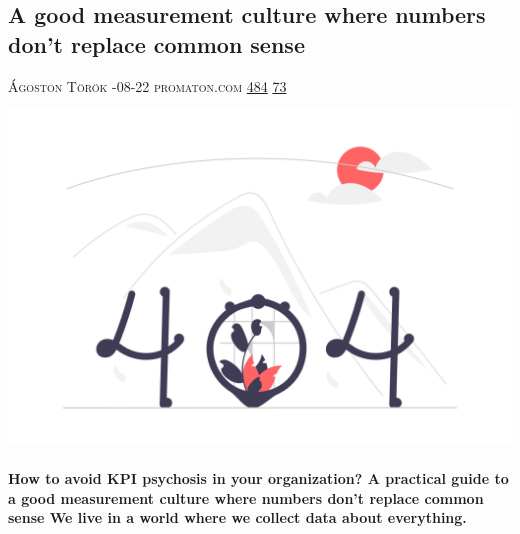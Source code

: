 \documentclass[10pt,a4paper]{article}
\begin{document}
\begin{multicols*}{2}
\begin{minipage}{\linewidth}
\subsection{A good measurement culture where numbers don’t replace common sense}
\textsc{\footnotesize
{\scriptsize\faUser}\space 
Ágoston Török 
{\scriptsize\faCalendar}-08-22 
{\scriptsize\faGlobe}\space 
promaton.com 
{\scriptsize\faThumbsOUp}\space 
\href{http://news.ycombinator.com/item?id=37220667\&utm\_term=comment}{484} 
{\scriptsize\faComments}\space 
\href{http://news.ycombinator.com/item?id=37220667\&utm\_term=comment}{73} 
}
\par\medskip\noindent
\href{https://blog.promaton.com/how-to-avoid-kpi-psychosis-in-your-organization-5ffc83967f2b?utm\_source=hackernewsletter\&utm\_medium=email\&utm\_term=working}{
    \includegraphics[width=0.99\linewidth]{notfound.png}
}
\end{minipage}
\paragraph{}
\textbf{How to avoid KPI psychosis in your organization?
A practical guide to a good measurement culture where numbers don’t replace common sense
We live in a world where we collect data about everything.}

\end{multicols*}
\end{document}
